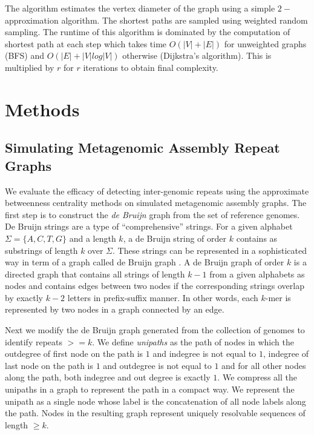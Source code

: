 \documentclass[runningheads,a4paper]{llncs}
\begin{document}
The algorithm estimates the vertex diameter of the graph using a simple $2-$approximation algorithm. The shortest paths are sampled using weighted random sampling. The runtime of this algorithm is dominated by the computation of shortest path at each step which takes time $O(|V| + |E|)$ for unweighted graphs (BFS) and $O(|E| + |V|log|V|)$ otherwise (Dijkstra's algorithm). This is multiplied by $r$ for $r$ iterations to obtain final complexity.


\section{Methods}


\subsection*{Simulating Metagenomic Assembly Repeat Graphs}

We evaluate the efficacy of detecting inter-genomic repeats using the approximate betweenness centrality methods on simulated metagenomic assembly graphs.
The first step is to construct the \textit{de Bruijn} graph from the set of reference genomes.
De Bruijn strings are a type of ``comprehensive'' strings. For a given alphabet $\Sigma = \{A,C,T,G\}$ and a length $k$, a de Bruijn string of order $k$ contains as substrings of length $k$ over $\Sigma$. These strings can be represented in a sophisticated way in term of a graph called de Bruijn graph \cite{debruijn}. A de Bruijn graph of order $k$ is a directed graph that contains all strings of length $k-1$ from a given alphabets as nodes and contains edges between two nodes if the corresponding strings overlap by exactly $k-2$ letters in prefix-suffix manner. In other words, each $k$-mer is represented by two nodes in a graph connected by an edge. 

Next we modify the de Bruijn graph generated from the collection of genomes to identify repeats $>=k$. We define \textit{unipaths} as the path of nodes in which the outdegree of first node on the path is $1$ and indegree is not equal to $1$, indegree of last node on the path is $1$ and outdegree is not equal to $1$ and for all other nodes along the path, both indegree and out degree is exactly $1$. We compress all the unipaths in a graph to represent the path in a compact way. We represent the unipath as a single node whose label is the concatenation of all node labels along the path.
Nodes in the resulting graph represent uniquely resolvable sequences of length $\geq k$.
\end{document}
